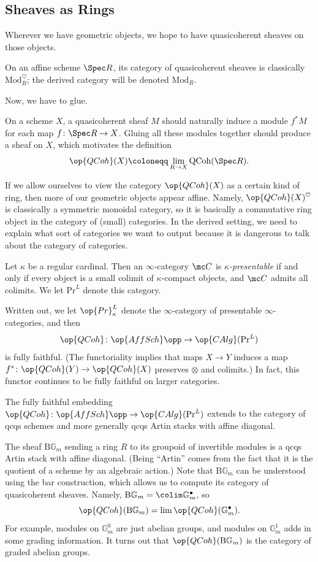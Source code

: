 \documentclass[../notes.tex]{subfiles}
\begin{document}
\subsection{Sheaves as Rings}
Wherever we have geometric objects, we hope to have quasicoherent sheaves on those objects.
\begin{example}
	On an affine scheme $\Spec R$, its category of quasicoherent sheaves is classically $\mathrm{Mod}_R^\heartsuit$; the derived category will be denoted $\mathrm{Mod}_R$.
\end{example}
Now, we have to glue.
\begin{example}
	On a scheme $X$, a quasicoherent sheaf $M$ should naturally induce a module $f^*M$ for each map $f\colon\Spec R\to X$. Gluing all these modules together should produce a sheaf on $X$, which motivates the definition
	\[\op{QCoh}(X)\coloneqq\lim_{R\to X}\mathrm{QCoh}(\Spec R).\]
\end{example}
If we allow ourselves to view the category $\op{QCoh}(X)$ as a certain kind of ring, then more of our geometric objects appear affine. Namely, $\op{QCoh}(X)^\heartsuit$ is classically a symmetric monoidal category, so it is basically a commutative ring object in the category of (small) categories. In the derived setting, we need to explain what sort of categories we want to output because it is dangerous to talk about the category of categories.
\begin{definition}
	Let $\kappa$ be a regular cardinal. Then an $\infty$-category $\mc C$ is \textit{$\kappa$-presentable} if and only if every object is a small colimit of $\kappa$-compact objects, and $\mc C$ admits all colimits. We let $\mathrm{Pr}^L$ denote this category.
\end{definition}
Written out, we let $\op{Pr}^L_\kappa$ denote the $\infty$-category of presentable $\infty$-categories, and then
\[\op{QCoh}\colon\op{AffSch}\opp\to\op{CAlg}(\mathrm{Pr}^L)\]
is fully faithful. (The functoriality implies that maps $X\to Y$ induces a map $f^*\colon\op{QCoh}(Y)\to\op{QCoh}(X)$ preserves $\otimes$ and colimits.) In fact, this functor continues to be fully faithful on larger categories.
\begin{theorem}
	The fully faithful embedding $\op{QCoh}\colon\op{AffSch}\opp\to\op{CAlg}(\mathrm{Pr}^L)$ extends to the category of qcqs schemes and more generally qcqs Artin stacks with affine diagonal.
\end{theorem}
\begin{example}
	The sheaf $\mathrm B\mathbb G_m$ sending a ring $R$ to its groupoid of invertible modules is a qcqs Artin stack with affine diagonal. (Being ``Artin'' comes from the fact that it is the quotient of a scheme by an algebraic action.) Note that $\mathrm B\mathbb G_m$ can be understood using the bar construction, which allows us to compute its category of quasicoherent sheaves. Namely, $\mathrm B\mathbb G_m=\colim\mathbb G_m^\bullet$, so
	\[\op{QCoh}(\mathrm B\mathbb G_m)=\lim\op{QCoh}(\mathbb G_m^\bullet).\]
	For example, modules on $\mathbb G_m^0$ are just abelian groups, and modules on $\mathbb G_m^1$ adds in some grading information. It turns out that $\op{QCoh}(\mathrm B\mathbb G_m)$ is the category of graded abelian groups.
\end{example}
\end{document}
